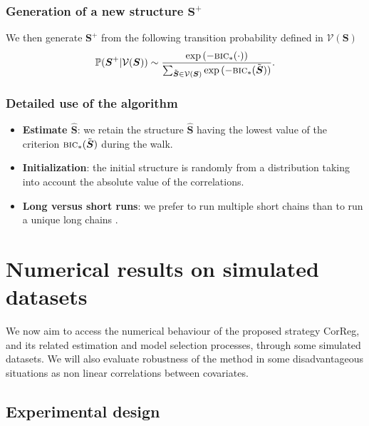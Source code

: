 \documentclass[11pt,a4paper]{article}
\begin{document}
	\subsubsection{Generation of a new structure $\boldsymbol{S}^+$}
	
We then generate $\boldsymbol{S}^+$ from the following transition probability defined in  $\mathcal{V}(\boldsymbol{S})$
	\begin{equation}
	\mathbb{P}(\boldsymbol{S}^+|\mathcal{V}(\boldsymbol{S})) \sim \frac{\exp{(-\mbox{{\sc bic}}_*(\cdot))}}{\sum_{\tilde{\boldsymbol{S}}\in \mathcal{V}(\boldsymbol{S})}\exp{(-\mbox{{\sc bic}}_*(\tilde{\boldsymbol{S}}))}}.
	\end{equation}
	
 \subsubsection{Detailed use of the algorithm}

\begin{itemize}
\item {\bf Estimate $\hat{\boldsymbol{S}}$}: we retain the structure $\hat{\boldsymbol{S}}$ having the lowest value of the criterion $\mbox{{\sc bic}}_*(\tilde{\boldsymbol{S}})$ during the walk.
\item {\bf Initialization}: the initial structure is randomly from a distribution taking into account the absolute value of the correlations.
\item {\bf Long versus short runs}: we prefer to run multiple short chains than to run a unique long chains \cite{gilks1996markov}.
\end{itemize} 
	
\section{Numerical results on simulated datasets} \label{sectionsimul}

We now aim to access the numerical behaviour of the proposed strategy {\sc CorReg}, and its related estimation and model selection processes, through some simulated datasets. We will also evaluate robustness of the method in some disadvantageous situations as non linear correlations between covariates.

	\subsection{Experimental design}
	
\end{document}
